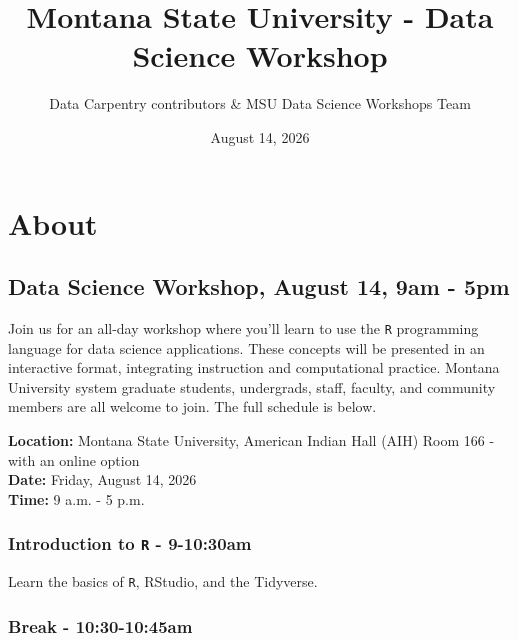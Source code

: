 \documentclass[
  10pt,
  letterpaper,
  twoside,
  openright]{book}
\title{Montana State University - Data Science Workshop}
\author{Data Carpentry contributors \& MSU Data Science Workshops Team}
\date{August 14, 2026}
\begin{document}
\frontmatter
\maketitle

{
\setcounter{tocdepth}{1}
\tableofcontents
}
\mainmatter
\hypertarget{about}{%
\chapter*{About}\label{about}}

\hypertarget{data-science-workshop-august-14-9am---5pm}{%
\section*{Data Science Workshop, August 14, 9am -
5pm}\label{data-science-workshop-august-14-9am---5pm}}

Join us for an all-day workshop where you'll learn to use the \texttt{R}
programming language for data science applications. These concepts will
be presented in an interactive format, integrating instruction and
computational practice. Montana University system graduate students,
undergrads, staff, faculty, and community members are all welcome to
join. The full schedule is below.

\textbf{Location:} Montana State University, American Indian Hall (AIH)
Room 166 - with an online option\\
\textbf{Date:} Friday, August 14, 2026\\
\textbf{Time:} 9 a.m. - 5 p.m.

\hypertarget{introduction-to-r---9-1030am}{%
\subsection*{\texorpdfstring{Introduction to \texttt{R} -
9-10:30am}{Introduction to R - 9-10:30am}}\label{introduction-to-r---9-1030am}}

Learn the basics of \texttt{R}, RStudio, and the Tidyverse.

\hypertarget{break---1030-1045am}{%
\subsection*{Break - 10:30-10:45am}\label{break---1030-1045am}}
\end{document}
